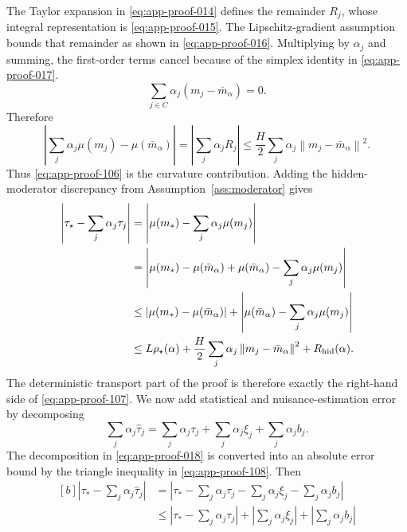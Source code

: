 \documentclass[11pt]{article}
\numberwithin{equation}{section}
\newcommand{\1}{\mathbf 1}
\newcommand{\norm}[1]{\left\lVert #1\right\rVert}
\newcommand{\abs}[1]{\left\lvert #1\right\rvert}
\begin{document}
The Taylor expansion in \eqref{eq:app-proof-014} defines the remainder
\(R_j\), whose integral representation is \eqref{eq:app-proof-015}.  The
Lipschitz-gradient assumption bounds that remainder as shown in
\eqref{eq:app-proof-016}.
Multiplying by \(\alpha_j\) and summing, the first-order terms cancel because
of the simplex identity in \eqref{eq:app-proof-017}.
\begin{equation}
\label{eq:app-proof-017}
\sum_{j\in C}\alpha_j(m_j-\bar m_\alpha)=0.
\end{equation}
Therefore
\begin{equation}
\label{eq:app-proof-106}
  \abs{\sum_j\alpha_j\mu(m_j)-\mu(\bar m_\alpha)}=\abs{\sum_{j}\alpha_jR_j}
  \le
  \frac{H}{2}\sum_j\alpha_j\norm{m_j-\bar m_\alpha}^2.
\end{equation}
Thus \eqref{eq:app-proof-106} is the curvature contribution.  Adding the hidden-moderator discrepancy
from Assumption~\ref{ass:moderator} gives
\begin{equation}
\label{eq:app-proof-107}
\begin{aligned}[b]
  \abs{\tau_\star-\sum_j\alpha_j\tau_j}
  &=\abs{\mu(m_*)-\sum_j\alpha_j\mu(m_j)}\\
  &=\abs{\mu(m_*)-\mu(\bar{m}_{\alpha})+\mu(\bar{m}_{\alpha})-\sum_j\alpha_j\mu(m_j)}\\
  &\leq \abs{\mu(m_*)-\mu(\bar{m}_{\alpha})}+\abs{\mu(\bar{m}_{\alpha})-\sum_j\alpha_j\mu(m_j)}\\
  &\le
  L\rho_\star(\alpha)
  +\frac{H}{2}\sum_j\alpha_j\norm{m_j-\bar m_\alpha}^2
  +R_{\rm hid}(\alpha).
\end{aligned}
\end{equation}
The deterministic transport part of the proof is therefore exactly the
right-hand side of \eqref{eq:app-proof-107}.  We now add statistical and
nuisance-estimation error by decomposing
\begin{equation}
\label{eq:app-proof-018}
\sum_j\alpha_j\widehat\tau_j
  =\sum_j\alpha_j\tau_j+
    \sum_j\alpha_j\xi_j+
    \sum_j\alpha_jb_j.
\end{equation}
The decomposition in \eqref{eq:app-proof-018} is converted into an absolute
error bound by the triangle inequality in \eqref{eq:app-proof-108}.
Then
\begin{equation}
\label{eq:app-proof-108}
\begin{aligned}[b]
\abs{\tau_*-\sum_j\alpha_j\widehat\tau_j}
&=\abs{\tau_*-\sum_j\alpha_j\tau_j-\sum_j\alpha_j\xi_j-\sum_j\alpha_jb_j}\\
&\leq \abs{\tau_*-\sum_j\alpha_j\tau_j}+\abs{\sum_j\alpha_j\xi_j}+\abs{\sum_j\alpha_jb_j}
\end{aligned}
\end{equation}
\end{document}
